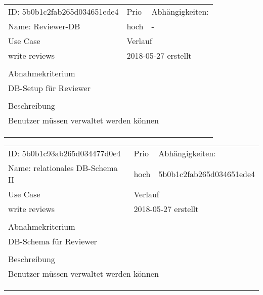 \documentclass{article}
\begin{document}
\pagebreak

\resizebox{10cm}{!} {
\begin{tabular}{lllll}
  \hline
  \multicolumn{2}{|l|}{\tiny{ID: 5b0b1c2fab265d034651ede4}} & Prio & \multicolumn{2}{|l|}{Abhängigkeiten:} \\
  \multicolumn{2}{|l|}{Name: Reviewer-DB} & hoch & \multicolumn{2}{|l|}{\tiny{-}} \\
  \hline
  \multicolumn{2}{|l|}{Use Case} & \multicolumn{3}{|l|}{Verlauf} \\
  \multicolumn{2}{|l|}{write reviews} & \multicolumn{3}{|l|}{2018-05-27 erstellt} \\
  \multicolumn{2}{|l|}{} & \multicolumn{3}{|l|}{} \\
  \hline
  \multicolumn{5}{|l|}{Abnahmekriterium} \\
  \multicolumn{5}{|l|}{DB-Setup für Reviewer} \\
  \multicolumn{5}{|l|}{} \\
  \hline
  \multicolumn{5}{|l|}{Beschreibung} \\
  \multicolumn{5}{|l|}{Benutzer müssen verwaltet werden können} \\
  \multicolumn{5}{|l|}{} \\
  \multicolumn{5}{|l|}{} \\
  \multicolumn{5}{|l|}{} \\
  \hline
\end{tabular}
}
\resizebox{10cm}{!} {
\begin{tabular}{lllll}
  \hline
  \multicolumn{2}{|l|}{\tiny{ID: 5b0b1c93ab265d034477d0e4}} & Prio & \multicolumn{2}{|l|}{Abhängigkeiten:} \\
  \multicolumn{2}{|l|}{Name: relationales DB-Schema II} & hoch & \multicolumn{2}{|l|}{\tiny{5b0b1c2fab265d034651ede4}} \\
  \hline
  \multicolumn{2}{|l|}{Use Case} & \multicolumn{3}{|l|}{Verlauf} \\
  \multicolumn{2}{|l|}{write reviews} & \multicolumn{3}{|l|}{2018-05-27 erstellt} \\
  \multicolumn{2}{|l|}{} & \multicolumn{3}{|l|}{} \\
  \hline
  \multicolumn{5}{|l|}{Abnahmekriterium} \\
  \multicolumn{5}{|l|}{DB-Schema für Reviewer} \\
  \multicolumn{5}{|l|}{} \\
  \hline
  \multicolumn{5}{|l|}{Beschreibung} \\
  \multicolumn{5}{|l|}{Benutzer müssen verwaltet werden können} \\
  \multicolumn{5}{|l|}{} \\
  \multicolumn{5}{|l|}{} \\
  \multicolumn{5}{|l|}{} \\
  \hline
\end{tabular}
}
\end{document}
